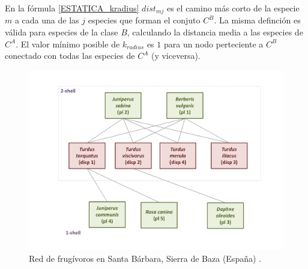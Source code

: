 En la fórmula \ref{ESTATICA_kradius} $dist_{mj}$ es el camino más corto de la especie $m$ a cada una de las $j$ especies que forman el conjuto $C^B$. La misma definción es válida para especies de la clase $B$, calculando la distancia media a las especies de $C^A$. El valor mínimo posible de $k_{radius}$ es $1$ para un nodo perteciente a $C^B$ conectado con todas las especies de $C^A$ (y viceversa).


\begin{figure}[h!]
\centering
\includegraphics[scale=0.55]{Figures/ESTATICA_SD_030_example_network.pdf}
\caption {Red de frugívoros en Santa Bárbara, Sierra de Baza (España) \cite{jordano1993geographical}.}
\label{fig:ESTATICA_red_example}
\end{figure}

%

